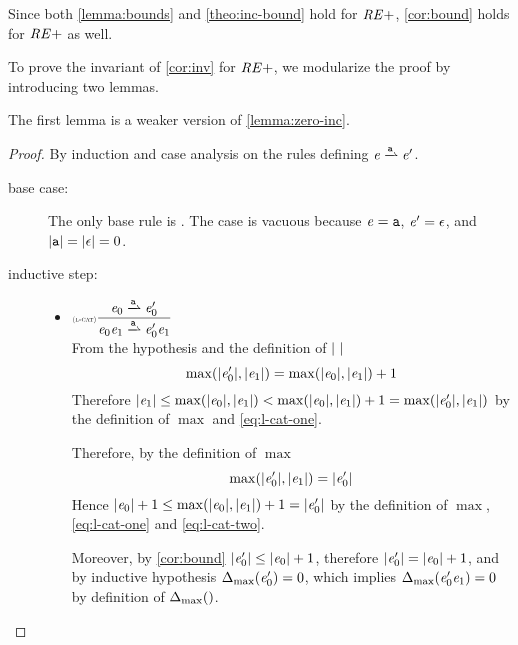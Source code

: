 Since both \cref{lemma:bounds} and \cref{theo:inc-bound} hold for $\mathit {RE+}$, \cref{cor:bound} holds for $\mathit {RE+}$ as well.

To prove the invariant of \cref{cor:inv} for $\mathit {RE+}$, we modularize the proof by introducing two lemmas.

The first lemma is a weaker version of \cref{lemma:zero-inc}.

\begin{proof}
 By induction and case analysis on the rules defining $\re\parDer{\sym}\re'$.
 \begin{description}
  \item[base case:] The only base rule is .
   The case is vacuous because $\mathit {e}=\mathtt {a}$, $\mathit {e}'=\mathtt {\epsilon}$, and ${\mid}{\mathtt {a}}{\mid}={\mid}{\mathtt {\epsilon}}{\mid}=0$.
  \item[inductive step:] \hspace*{\fill}
   \begin{itemize}
    \item $\Rule{l-cat}{\re_0\parDer{\sym}\re'_0}{\re_0\catop\re_1\parDer{\sym}\re'_0\catop\re_1}{}$\\[2ex]
          From the hypothesis and the definition of ${\mid}{\ }{\mid}$
          \begin{equation}
           \label{eq:l-cat-one}
           \max({\mid}{\mathit {e}_0'}{\mid},{\mid}{\mathit {e}_1}{\mid})=\max({\mid}{\mathit {e}_0}{\mid},{\mid}{\mathit {e}_1}{\mid})+1
          \end{equation}
          Therefore ${\mid}{\mathit {e}_1}{\mid}\leq\max({\mid}{\mathit {e}_0}{\mid},{\mid}{\mathit {e}_1}{\mid})<\max({\mid}{\mathit {e}_0}{\mid},{\mid}{\mathit {e}_1}{\mid})+1=\max({\mid}{\mathit {e}_0'}{\mid},{\mid}{\mathit {e}_1}{\mid})$ by the definition of $\max$ and \cref{eq:l-cat-one}.

          Therefore, by the definition of $\max$
          \begin{equation}
           \label{eq:l-cat-two}
           \max({\mid}{\mathit {e}_0'}{\mid},{\mid}{\mathit {e}_1}{\mid})={\mid}{\mathit {e}_0'}{\mid}
          \end{equation}
          Hence ${\mid}{\mathit {e}_0}{\mid}+1\leq\max({\mid}{\mathit {e}_0}{\mid},{\mid}{\mathit {e}_1}{\mid})+1={\mid}{\mathit {e}'_0}{\mid}$ by the definition of $\max$, \cref{eq:l-cat-one} and \cref{eq:l-cat-two}.

          Moreover, by \cref{cor:bound} ${\mid}{\mathit {e}_0'}{\mid}\leq{\mid}{\ensuremath{\mathit {e}}_0}{\mid}+1$, therefore
          ${\mid}{\mathit {e}_0'}{\mid}={\mid}{\mathit {e}_0}{\mid}+1$, and by inductive hypothesis ${\Delta_{\max}}({\mathit {e}'_0})=0$, which implies ${\Delta_{\max}}({\mathit {e}'_0\mathit {e}_1})=0$ by definition of ${\Delta_{\max}}({})$.


\end{itemize}
\end{description}
\end{proof}
